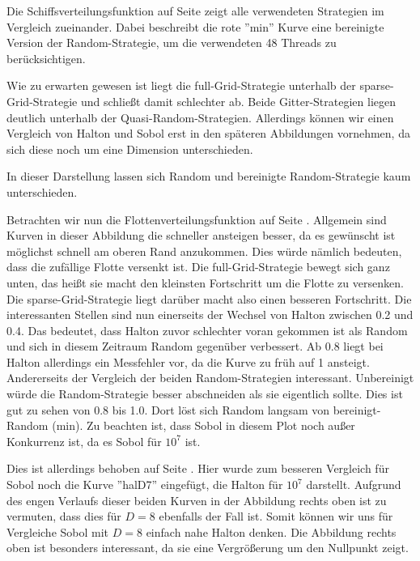 \documentclass[a4paper,12pt]{llncs}
\numberwithin{equation}{section}
\begin{document}
\begin{landscape}
	\label{fig:compare3}
	
\end{landscape}

Die Schiffsverteilungsfunktion auf Seite \pageref{fig:compare1} zeigt alle verwendeten Strategien im Vergleich zueinander. Dabei beschreibt die rote ''min'' Kurve eine bereinigte Version der Random-Strategie, um die verwendeten 48 Threads zu berücksichtigen. 

Wie zu erwarten gewesen ist liegt die full-Grid-Strategie unterhalb der sparse-Grid-Strategie und schließt damit schlechter ab. Beide Gitter-Strategien liegen deutlich unterhalb der Quasi-Random-Strategien. Allerdings können wir einen Vergleich von Halton und Sobol erst in den späteren Abbildungen vornehmen, da sich diese noch um eine Dimension unterschieden. 

In dieser Darstellung lassen sich Random und bereinigte Random-Strategie kaum unterschieden.

Betrachten wir nun die Flottenverteilungsfunktion auf Seite \pageref{fig:compare1}. Allgemein sind Kurven in dieser Abbildung die schneller ansteigen besser, da es gewünscht ist möglichst schnell am oberen Rand anzukommen. Dies würde nämlich bedeuten, dass die zufällige Flotte versenkt ist. 
Die full-Grid-Strategie bewegt sich ganz unten, das heißt sie macht den kleinsten Fortschritt um die Flotte zu versenken. Die sparse-Grid-Strategie liegt darüber macht also einen besseren Fortschritt. 
Die interessanten Stellen sind nun einerseits der Wechsel von Halton zwischen 0.2 und 0.4. Das bedeutet, dass Halton zuvor schlechter voran gekommen ist als Random und sich in diesem Zeitraum Random gegenüber verbessert. Ab 0.8 liegt bei Halton allerdings ein Messfehler vor, da die Kurve zu früh auf 1 ansteigt. Andererseits der Vergleich der beiden Random-Strategien interessant. Unbereinigt würde die Random-Strategie besser abschneiden als sie eigentlich sollte. Dies ist gut zu sehen von 0.8 bis 1.0. Dort löst sich Random langsam von bereinigt-Random (min). Zu beachten ist, dass Sobol in diesem Plot noch außer Konkurrenz ist, da es Sobol für $10^7$ ist.

Dies ist allerdings behoben auf Seite \pageref{fig:compare2}. Hier wurde zum besseren Vergleich für Sobol noch die Kurve ''halD7'' eingefügt, die Halton für $10^7$ darstellt. Aufgrund des engen Verlaufs dieser beiden Kurven in der Abbildung rechts oben ist zu vermuten, dass dies für $D=8$ ebenfalls der Fall ist. Somit können wir uns für Vergleiche Sobol mit $D=8$ einfach nahe Halton denken. Die Abbildung rechts oben ist besonders interessant, da sie eine Vergrößerung um den Nullpunkt zeigt. 
\end{document}
